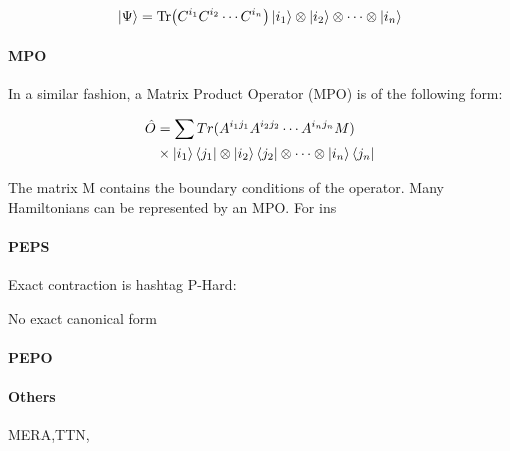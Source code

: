 \begin{equation}
	\ket{\Psi} = \Tr( C^{i_1} C^{i_2} \cdots C^{i_n}  ) \ket{i_1} \otimes \ket{i_2} \otimes \cdots \otimes \ket{i_n}
\end{equation}


\paragraph{MPO}

In a similar fashion, a Matrix Product Operator (MPO) is of the following form:

\begin{equation} \label{def_mpo}
	\begin{split}
		\hat{O} &= \sum Tr(A^{i_1 j_1} A^{i_2 j_2} \cdots A^{i_n j_n} M) \\
		& \times \ket{i_1}\bra{j_1} \otimes \ket{i_2}\bra{j_2} \otimes \cdots \otimes \ket{i_n}\bra{j_n}
	\end{split}
\end{equation}


The matrix M contains the boundary conditions of the operator. Many Hamiltonians can be represented by an MPO. For ins

\paragraph{PEPS}

Exact contraction is hashtag P-Hard:

No exact canonical form

\paragraph{PEPO}

\paragraph{Others}

MERA,TTN,